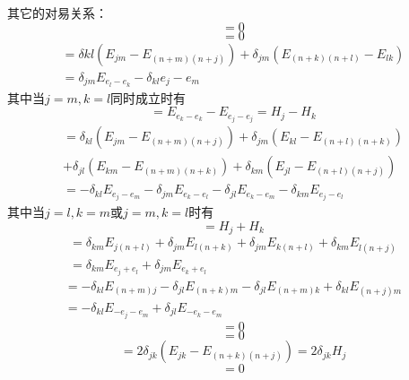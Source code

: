 \documentclass{ctexart}
\begin{document}
	其它的对易关系：
	\begin{equation}
	[E_{e_j+e_k},E_{e_l+e_m}]=0
	\end{equation}
	\begin{equation}
	[E_{-e_j-e_k},E_{-e_l-e_m}]=0
	\end{equation}
	\begin{multline}
	[E_{e_j-e_k},E_{e_l-e_m}]=\delta{kl}(E_{jm}-E_{(n+m)(n+j)})+\delta_{jm}(E_{(n+k)(n+l)}-E_{lk})\\=\delta_{jm}E_{e_l-e_k}-\delta_{kl}{e_j-e_m}
	\end{multline}
	其中当$j=m,k=l$同时成立时有
	\begin{equation}
	[E_{e_j-e_k},E_{e_k-e_j}]=E_{e_k-e_k}-E_{e_j-e_j}=H_j-H_k
	\end{equation}
	\begin{multline}
	[E_{e_j+e_k},E_{-e_l-e_m}]=\delta_{kl}(E_{jm}-E_{(n+m)(n+j)})+\delta_{jm}(E_{kl}-E_{(n+l)(n+k)})\\+\delta_{jl}(E_{km}-E_{(n+m)(n+k)})+\delta_{km}(E_{jl}-E_{(n+l)(n+j)})\\=-\delta_{kl}E_{e_j-e_m}-\delta_{jm}E_{e_k-e_l}-\delta_{jl}E_{e_k-e_m}-\delta_{km}E_{e_j-e_l}
	\end{multline}
	其中当$j=l,k=m$或$j=m,k=l$时有
	\begin{equation}
	[E_{e_j+e_k},E_{-e_j-e_k}]=H_j+H_k
	\end{equation}
	\begin{multline}
	[E_{e_j+e_k},E_{e_l-e_m}]=\delta_{km}E_{j(n+l)}+\delta_{jm}E_{l(n+k)}+\delta_{jm}E_{k(n+l)}+\delta_{km}E_{l(n+j)}\\=\delta_{km}E_{e_j+e_l}+\delta_{jm}E_{e_k+e_l}
	\end{multline}
	\begin{multline}
	[E_{-e_j-e_k},E_{e_l-e_m}]=-\delta_{kl}E_{(n+m)j}-\delta_{jl}E_{(n+k)m}-\delta_{jl}E_{(n+m)k}+\delta_{kl}E_{(n+j)m}\\=-\delta_{kl}E_{-e_j-e_m}+\delta_{jl}E_{-e_k-e_m}
	\end{multline}
	\begin{equation}
	[E_{2e_j},E_{2e_k}]=0
	\end{equation}
	\begin{equation}
	[E_{-2e_j},E_{-2e_k}]=0
	\end{equation}
	\begin{equation}
	[E_{2e_j},E_{-2e_k}]=2\delta_{jk}(E_{jk}-E_{(n+k)(n+j)})=2\delta_{jk}H_j
	\end{equation}
	\begin{equation}
	[E_{e_j+e_k},E_{2e_l}]=0
	\end{equation}
\end{document}

